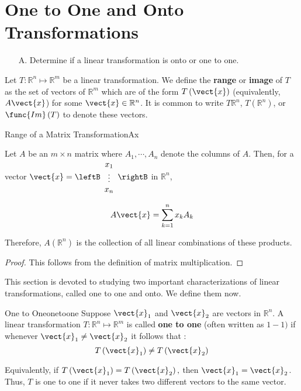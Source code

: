 \section{One to One and Onto Transformations}

\begin{outcome}
\begin{enumerate}
\item[A.]  Determine if a linear transformation is onto or one to one.
\end{enumerate}
\end{outcome}

Let $T: \mathbb{R}^n \mapsto \mathbb{R}^m$ be a linear transformation. We define the \textbf{range}  or \textbf{image}  of $T$ as the set of vectors of $\mathbb{R}^{m}$ which are of the form
$T \left(\vect{x}\right)$ (equivalently, $A\vect{x}$) for some $\vect{x}\in \mathbb{R}^{n}$. It is common
to write $T\mathbb{R}^{n}$, $T\left( \mathbb{R}^{n}\right)$, or
$\func{Im}\left( T\right) $ to denote these vectors.  

\begin{lemma}{Range of a Matrix Transformation}{Ax}

Let $A$ be an $m\times n$ matrix where $A_{1},\cdots , A_{n}$ denote the columns of
$A.$  Then, for a vector $\vect{x}=\leftB 
\begin{array}{c}
x_{1} \\
\vdots \\
 x_{n}
\end{array}
\rightB$ in $\mathbb{R}^n$,

\begin{equation*}
A\vect{x}=\sum_{k=1}^{n}x_{k}A_{k}
\end{equation*}

Therefore, $A \left( \mathbb{R}^n \right)$ is the collection of all
linear combinations of these products.
\end{lemma}

\begin{proof}
This follows from the definition of matrix multiplication.
\end{proof}

This section is devoted to studying two important characterizations of linear transformations, called one to one and onto. We define them now. 

\begin{definition}{One to One}{onetoone}
Suppose $\vect{x}_1$ and $\vect{x}_2$ are vectors in $\mathbb{R}^n$. A linear transformation $T: \mathbb{R}^n \mapsto \mathbb{R}^m$ is called \textbf{one to one}
 (often written as $1-1)$ if whenever
 $\vect{x}_1 \neq \vect{x}_2$ it follows that :
\begin{equation*}
T\left( \vect{x}_1 \right) \neq T \left(\vect{x}_2\right)
\end{equation*}

Equivalently, if $T\left( \vect{x}_1 \right) =T\left( \vect{x}_2\right) ,$
then $\vect{x}_1 = \vect{x}_2$. Thus,  $T$ is one to one if it never takes two different
vectors to the same vector.
\end{definition}

